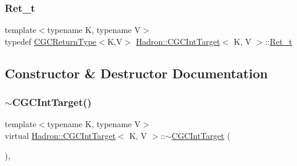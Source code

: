 \mbox{\label{classHadron_1_1CGCIntTarget_a3436ab6591c4722808ea25ced7b18c46}} 
\subsubsection{\texorpdfstring{Ret\_t}{Ret\_t}\hspace{0.1cm}{\footnotesize\ttfamily [3/3]}}
{\footnotesize\ttfamily template$<$typename K, typename V$>$ \\
typedef \mbox{\hyperlink{structHadron_1_1CGCReturnType}{C\+G\+C\+Return\+Type}}$<$K,V$>$ \mbox{\hyperlink{classHadron_1_1CGCIntTarget}{Hadron\+::\+C\+G\+C\+Int\+Target}}$<$ K, V $>$\+::\mbox{\hyperlink{classHadron_1_1CGCIntTarget_a3436ab6591c4722808ea25ced7b18c46}{Ret\+\_\+t}}}



\subsection{Constructor \& Destructor Documentation}
\mbox{\label{classHadron_1_1CGCIntTarget_a6b808ca161d3dae62109495144178541}} 
\subsubsection{\texorpdfstring{$\sim$CGCIntTarget()}{~CGCIntTarget()}\hspace{0.1cm}{\footnotesize\ttfamily [1/3]}}
{\footnotesize\ttfamily template$<$typename K, typename V$>$ \\
virtual \mbox{\hyperlink{classHadron_1_1CGCIntTarget}{Hadron\+::\+C\+G\+C\+Int\+Target}}$<$ K, V $>$\+::$\sim$\mbox{\hyperlink{classHadron_1_1CGCIntTarget}{C\+G\+C\+Int\+Target}} (\begin{DoxyParamCaption}{ }\end{DoxyParamCaption})\hspace{0.3cm}{\ttfamily [inline]}, {\ttfamily [virtual]}}



